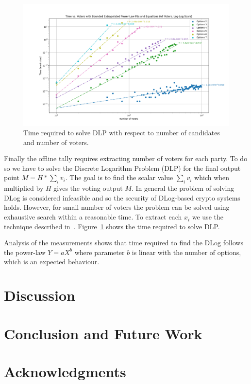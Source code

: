 \documentclass{article}
\begin{document}
\begin{figure}
    \centering
    \includegraphics[width=\textwidth]{dlog-search-time.png}
    \caption{Time required to solve DLP with respect to number of candidates and number of voters.}
    \label{fig:dlog-search}
\end{figure}
Finally the offline tally requires extracting number of voters for each party. To do so we have to solve the Discrete Logarithm Problem (DLP) for the final output point $M = H * \sum_i v_i$. The goal is to find the scalar value $\sum_i v_i$ which when multiplied by $H$ gives the voting output $M$. In general the problem of solving DLog is considered infeasible and so the security of DLog-based crypto systems holds. However, for small number of voters the problem can be solved using exhaustive search within a reasonable time. To extract each $x_i$ we use the technique described in~\cite{haoAnonymousVotingTworound2010}. Figure~\ref{fig:dlog-search} shows the time required to solve DLP.

Analysis of the measurements shows that time required to find the DLog follows the power-law $Y=aX^b$ where parameter $b$ is linear with the number of options, which is an expected behaviour.


\section{Discussion}

\section{Conclusion and Future Work}

\section{Acknowledgments}




\end{document}
